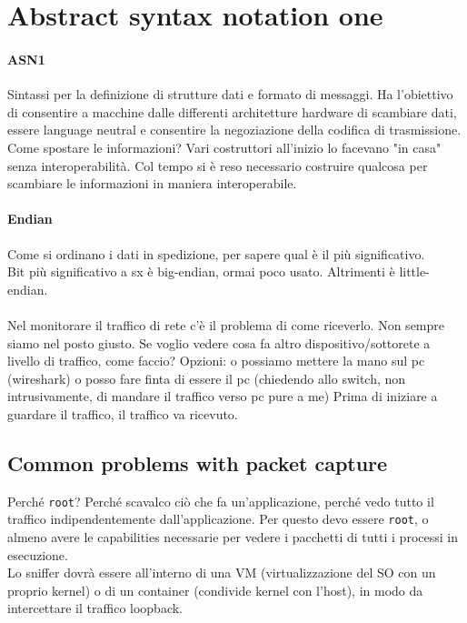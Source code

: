 \documentclass[10pt]{book}
\begin{document}
\section{Abstract syntax notation one}
\paragraph{ASN1} Sintassi per la definizione di strutture dati e formato di messaggi. Ha l'obiettivo di consentire a macchine dalle differenti architetture hardware di scambiare dati, essere language neutral e consentire la negoziazione della codifica di trasmissione.\\
Come spostare le informazioni? Vari costruttori all'inizio lo facevano "in casa" senza interoperabilità. Col tempo si è reso necessario costruire qualcosa per scambiare le informazioni in maniera interoperabile.
\paragraph{Endian} Come si ordinano i dati in spedizione, per sapere qual è il più significativo.\\
Bit più significativo a sx è big-endian, ormai poco usato. Altrimenti è little-endian.\\\\
Nel monitorare il traffico di rete c'è il problema di come riceverlo. Non sempre siamo nel posto giusto. Se voglio vedere cosa fa altro dispositivo/sottorete a livello di traffico, come faccio? Opzioni: o possiamo mettere la mano sul pc (wireshark) o posso fare finta di essere il pc (chiedendo allo switch, non intrusivamente, di mandare il traffico verso pc pure a me) Prima di iniziare a guardare il traffico, il traffico va ricevuto.\\
\subsection{Common problems with packet capture}
Perché \texttt{root}? Perché scavalco ciò che fa un'applicazione, perché vedo tutto il traffico indipendentemente dall'applicazione. Per questo devo essere \texttt{root}, o almeno avere le capabilities necessarie per vedere i pacchetti di tutti i processi in esecuzione.\\
Lo sniffer dovrà essere all'interno di una VM (virtualizzazione del SO con un proprio kernel) o di un container (condivide kernel con l'host), in modo da intercettare il traffico loopback.
\end{document}
